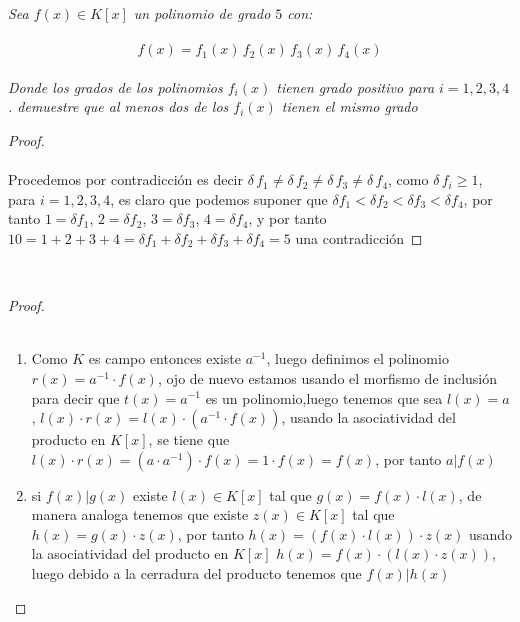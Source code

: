 \documentclass[11pt,letterpaper]{article}
\begin{document}
\begin{tcolorbox}[
	title = \textcolor{black}{\textcolor{white}{Problema 2}},]
\textit{Sea $f(x)\in K[x]$ un polinomio de grado $5$ con:\,\\
\,\\
\begin{equation*}
    f(x)=f_1(x)\,f_2(x)\,f_3(x)\,f_4(x)
\end{equation*}\,\\
Donde los grados de los polinomios $f_i(x)$ tienen grado positivo para $i=1,2,3,4$. demuestre que al menos 
dos de los $f_i(x)$ tienen el mismo grado
}
\end{tcolorbox}
\begin{proof}\,\\
    \,\\
    Procedemos por contradicci\'on es decir $\delta\,f_1\neq\delta\,f_2\neq\delta\,f_3\neq\delta\,f_4$, como $\delta\,f_i\geq 1$, para $i=1,2,3,4$, es claro que
    podemos suponer que $\delta f_1<\delta f_2<\delta f_3<\delta f_4$, por tanto $1=\delta f_1$, $2=\delta f_2$, $3=\delta f_3$, $4=\delta f_4$, y por tanto $10=1+2+3+4=\delta f_1+\delta f_2+\delta f_3+\delta f_4=5$ una contradicci\'on
\end{proof}\,\\
\begin{proof}\,\\
    \,\\
    \begin{enumerate}
        \item Como $K$ es campo entonces existe $a^{-1}$, luego definimos el polinomio $r(x)=a^{-1}\cdot f(x)$, ojo de nuevo estamos usando el morfismo de inclusi\'on
        para decir que $t(x)=a^{-1}$ es un polinomio,luego tenemos que sea $l(x)=a$, $l(x)\cdot r(x)=l(x)\cdot(a^{-1}\cdot f(x))$, usando la
        asociatividad del producto en $K[x]$, se tiene que $l(x)\cdot r(x)=(a\cdot a^{-1})\cdot f(x)=1\cdot f(x)=f(x)$, por tanto $a|f(x)$
        \item si $f(x)|g(x)$ existe $l(x)\in K[x]$ tal que $g(x)=f(x)\cdot l(x)$, de manera analoga tenemos que existe $z(x)\in K[x]$ tal que
        $h(x)=g(x)\cdot z(x)$, por tanto $h(x)=(f(x)\cdot l(x))\cdot z(x)$ usando la asociatividad del producto en $K[x]$ $h(x)=f(x)\cdot(l(x)\cdot z(x))$, luego
        debido a la cerradura del producto tenemos que $f(x)|h(x)$
    \end{enumerate}
\end{proof}\,\\
\end{document}
